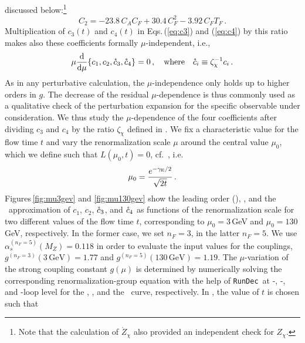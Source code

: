 discussed below:\footnote{Note that the calculation of
  $\mathring{Z}_\chi$ also provided an independent check for $Z_\chi$.}
\begin{equation}
  C_2 = -23.8 \, C_A C_F + 30.4 \, C_F^2 - 3.92 \, C_F T_F\,.
\end{equation}
Multiplication of $c_3(t)$ and
$c_4(t)$ in Eqs.\,(\ref{eq:c3}) and (\ref{eq:c4}) by this ratio makes
also these coefficients formally $\mu$-independent, i.e.,
\begin{equation}
  \begin{split}
    \mu\frac{\text{d} }{\text{d} \mu}\{c_1,c_2,\mathring{c}_3,\mathring{c}_4\}=0\,,\quad
    \text{where}\quad \mathring{c}_i\equiv \zeta_\chi^{-1} c_i\,.
  \end{split}
\end{equation}
As in any perturbative calculation, the $\mu$-independence only holds up
to higher orders in $g$. The decrease of the residual $\mu$-dependence
is thus commonly used as a qualitative check of the perturbation
expansion for the specific observable under consideration. We thus study
the $\mu$-dependence of the four coefficients after dividing $c_3$
and $c_4$ by the ratio $\zeta_\chi$ defined in . We fix a
characteristic value for the flow time $t$ and vary the renormalization
scale $\mu$ around the central value $\mu_0$, which we define such that
$L(\mu_0,t)=0$, cf.\ , i.e.
\begin{equation}
  \begin{split}
    \mu_0 = \frac{e^{-\gamma_\text{E}/2}}{\sqrt{2t}}\,.
    \label{eq:mu0}
  \end{split}
\end{equation}
Figures\,\ref{fig:mu3gev} and \ref{fig:mu130gev} show the leading order
(\lo), \nlo, and the \nnlo\ approximation of $c_1$, $c_2$, $\mathring{c}_3$,
and $\mathring{c}_4$ as functions of the renormalization scale for two
different values of the flow time $t$, corresponding to $\mu_0=3$\,GeV
and $\mu_0=130$\,GeV, respectively. In the former case, we set $n_F=3$,
in the latter $n_F=5$. We use $\alpha^{(n_F=5)}_s(M_Z)=0.118$ in order
to evaluate the input values for the couplings,
$g^{(n_F=3)}(3\,\text{GeV})=1.77$ and
$g^{(n_F=5)}(130\,\text{GeV})=1.19$.  The $\mu$-variation of the strong
coupling constant $g(\mu)$ is determined by numerically solving the
corresponding renormalization-group equation with the help of
\texttt{RunDec}\,\cite{Chetyrkin:2000yt,Herren:2017osy} at \one-, \two-,
and \three-loop level for the \lo, \nlo, and the \nnlo\ curve,
respectively.  In , the value of $t$ is chosen such that

